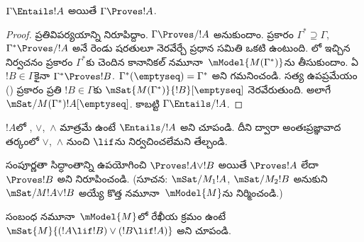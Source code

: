 \documentclass[../../../include/open-logic-section]{subfiles}
\begin{document}


\begin{thm}
  $\Gamma \Entails !A$ అయితే $\Gamma \Proves !A$.
\end{thm}

\begin{proof}
  ప్రతివిపర్యయాన్ని నిరూపిద్దాం.
  $\Gamma \Proves/ !A$ అనుకుందాం.
   ప్రకారం
  $\Gamma^*
  \supseteq \Gamma$, $\Gamma^* \Proves/ !A$
  అనే రెండు షరతులూ నెరవేర్చే ప్రధాన సమితి ఒకటి ఉంటుంది.
  లో ఇచ్చిన నిర్వచనం
  ప్రకారం $\Gamma^*$కు చెందిన కానానికల్
  నమూనా~$\mModel{M(\Gamma^*)}$ను తీసుకుందాం. ఏ $!B \in \Gamma$కైనా
  $\Gamma^*
  \Proves !B$. $\Gamma^*(\emptyseq) =
  \Gamma^*$ అని గమనించండి. సత్య
  ఉపప్రమేయం () ప్రకారం
  ప్రతి $!B \in \Gamma$కు
  $\mSat{M(\Gamma^*)}{!B}[\emptyseq]$ నెరవేరుతుంది.
  అలాగే $\mSat/{M(\Gamma^*)}{!A}[\emptyseq]$.
  కాబట్టి $\Gamma
  \Entails/ !A$.
\end{proof}

\begin{prob}
  $!A$లో ,
  $\lor$,~$\land$ మాత్రమే ఉంటే
  $\Entails/ !A$ అని చూపండి. దీని ద్వారా
  అంతఃప్రజ్ఞావాద తర్కంలో $\lor$,~$\land$
  నుంచి $\lif$ను నిర్వచించలేమని తేల్చండి.
\end{prob}

\begin{prob}
  సంపూర్ణతా సిద్ధాంతాన్ని ఉపయోగించి
  $\Proves !A \lor !B$ అయితే $\Proves !A$
  లేదా $\Proves !B$ అని నిరూపించండి.
  (సూచన: $\mSat/{M_1}{!A}$,
  $\mSat/{M_2}{!B}$ అనుకుని
  $\mSat/{M}{!A \lor !B}$ అయ్యే కొత్త
  నమూనా~$\mModel{M}$ను నిర్మించండి.)
\end{prob}

\begin{prob}
  సంబంధ నమూనా~$\mModel{M}$లో రేఖీయ క్రమం ఉంటే
  $\mSat{M}{(!A \lif !B)\lor(!B \lif !A)}$
  అని చూపండి.
\end{prob}
\end{document}
